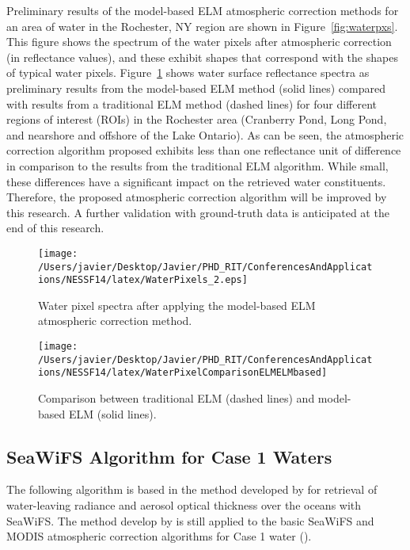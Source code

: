 Preliminary results of the model-based ELM atmospheric correction methods for an area of water in the Rochester, NY region are shown in Figure~\ref{fig:waterpxs}. This figure shows the spectrum of the water pixels after atmospheric correction (in reflectance values), and these exhibit shapes that correspond with the shapes of typical water pixels. Figure~\ref{fig:refcomp} shows water surface reflectance spectra as preliminary results from the model-based ELM method (solid lines) compared with results from a traditional ELM method (dashed lines) for four different regions of interest (ROIs) in the Rochester area (Cranberry Pond, Long Pond, and nearshore and offshore of the Lake Ontario). As can be seen, the atmospheric correction algorithm proposed exhibits less than one reflectance unit of difference in comparison to the results from the traditional ELM algorithm. While small, these differences have a significant impact on the retrieved water constituents. Therefore, the proposed atmospheric correction algorithm will be improved by this research. A further validation with ground-truth data is anticipated at the end of this research.
\begin{figure}[!ht]
  \begin{minipage}[c]{0.48\linewidth}
    \centering
      \texttt{[image: /Users/javier/Desktop/Javier/PHD\_RIT/ConferencesAndApplications/NESSF14/latex/WaterPixels\_2.eps]}
      \caption{Water pixel spectra after applying the model-based ELM atmospheric correction method.}
      \label{fig:waterpxs}
  \end{minipage}
  \hfill
  \begin{minipage}[d]{0.48\linewidth}
    \centering
      \texttt{[image: /Users/javier/Desktop/Javier/PHD\_RIT/ConferencesAndApplications/NESSF14/latex/WaterPixelComparisonELMELMbased]}
      \caption{Comparison between traditional ELM (dashed lines) and model-based ELM (solid lines).}
      \label{fig:refcomp}
  \end{minipage}
\end{figure}

\subsection{SeaWiFS Algorithm for Case 1 Waters}
The following algorithm is based in the method developed by \cite{Gordon:1994} for retrieval of water-leaving radiance and aerosol optical thickness over the oceans with SeaWiFS. The method develop by \cite{Gordon:1994} is still applied to the basic SeaWiFS and MODIS atmospheric correction algorithms for Case 1 water (\cite{IOCCG:2010}).

